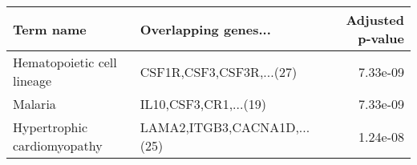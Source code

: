 \begin{tabular}{llr}
\toprule
                  Term name &        Overlapping genes... &  Adjusted p-value \\
\midrule
 Hematopoietic cell lineage &    CSF1R,CSF3,CSF3R,...(27) &          7.33e-09 \\
                    Malaria &       IL10,CSF3,CR1,...(19) &          7.33e-09 \\
Hypertrophic cardiomyopathy & LAMA2,ITGB3,CACNA1D,...(25) &          1.24e-08 \\
\bottomrule
\end{tabular}
